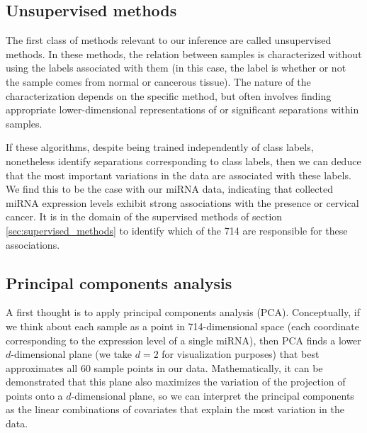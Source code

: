 \documentclass[12pt,english]{article}\usepackage{graphicx, color}
\numberwithin{equation}{section}
\numberwithin{figure}{section}
\theoremstyle{plain}
\theoremstyle{remark}
\begin{document}
\subsection{Unsupervised methods}
\label{sec:unsupervised}

The first class of methods relevant to our inference are called
unsupervised methods. In these methods, the relation between samples
is characterized without using the labels associated with them (in
this case, the label is whether or not the sample comes from normal or
cancerous tissue). The nature of the characterization depends on the
specific method, but often involves finding appropriate
lower-dimensional representations of or significant separations within
samples.

If these algorithms, despite being trained independently of
class labels, nonetheless identify separations corresponding to
class labels, then we can deduce that the most important variations in
the data are associated with these labels. We find this to be the case
with our miRNA data, indicating that collected miRNA expression levels
exhibit strong associations with the presence or cervical cancer. It
is in the domain of the supervised methods of section
\ref{sec:supervised_methods} to identify which of the 714
are responsible for these associations.

\subsection{Principal components analysis}

A first thought is to apply principal components analysis (PCA).
Conceptually, if we think about each sample as a point in
714-dimensional space (each coordinate corresponding to the
expression level of a single miRNA), then PCA finds a lower
$d$-dimensional plane (we take $d = 2$ for visualization purposes)
that best approximates all 60 sample points in our data.
Mathematically, it can be demonstrated that this plane also maximizes
the variation of the projection of points onto a $d$-dimensional
plane, so we can interpret the principal components as the linear
combinations of covariates that explain the most variation in the
data.
\end{document}
